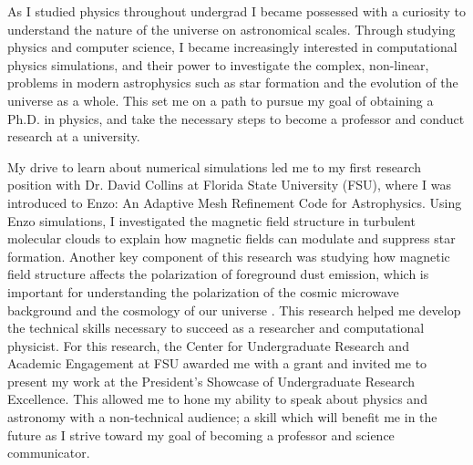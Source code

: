 \documentclass[letterpaper, 12pt]{article}
\begin{document}

\thispagestyle{fancyplain}

As I studied physics throughout undergrad I became possessed with a curiosity to understand the nature of the universe on astronomical scales. Through studying physics and computer science, I became increasingly interested in computational physics simulations, and their power to investigate the complex, non-linear, problems in modern astrophysics such as star formation and the evolution of the universe as a whole. This set me on a path to pursue my goal of obtaining a Ph.D. in physics, and take the necessary steps to become a professor and conduct research at a university.

My drive to learn about numerical simulations led me to my first research position with Dr. David Collins at Florida State University (FSU), where I was introduced to Enzo: An Adaptive Mesh Refinement Code for Astrophysics. Using Enzo simulations, I investigated the magnetic field structure in turbulent molecular clouds to explain how magnetic fields can modulate and suppress star formation. Another key component of this research was studying how magnetic field structure affects the polarization of foreground dust emission, which is important for understanding the polarization of the cosmic microwave background and the cosmology of our universe \citep{Clark2015}. This research helped me develop the technical skills necessary to succeed as a researcher and computational physicist. For this research, the Center for Undergraduate Research and Academic Engagement at FSU awarded me with a grant and invited me to present my work at the President’s Showcase of Undergraduate Research Excellence. This allowed me to hone my ability to speak about physics and astronomy with a non-technical audience; a skill which will benefit me in the future as I strive toward my goal of becoming a professor and science communicator.
\end{document}
